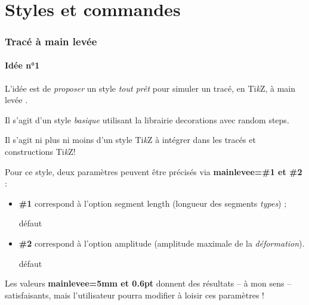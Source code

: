 \documentclass[french,a4paper,11pt]{article}
\providecommand\tikzlogo{Ti\textit{k}Z}
\let\TikZ\tikzlogo
\newcommand\Cle[1]{{\bfseries\sffamily\textlangle #1\textrangle}}
\begin{document}
\vfill~

\pagebreak

\part{Styles et commandes}

\section{Tracé à main levée}

\subsection{Idée n°1}

\begin{tipblock}
L'idée est de \textit{proposer} un style \textit{tout prêt} pour simuler un tracé, en \TikZ, à \og main levée \fg.

Il s'agit d'un style \textit{basique} utilisant la librairie \textsf{decorations} avec \textsf{random steps}.
\end{tipblock}

\begin{DemoCode}
\end{DemoCode}

\begin{cautionblock}
Il s'agit ni plus ni moins d'un style \TikZ{} à intégrer dans les tracés et constructions \TikZ !

\smallskip

Pour ce style, deux paramètres peuvent être précisés via \Cle{mainlevee=\#1 et \#2} :

\begin{itemize}
	\item \Cle{\#1} correspond à l'option \textsf{segment length} (longueur des segments \textit{types}) ;
	
	\hfill{}défaut \Cle{5mm}
	\item \Cle{\#2} correspond à l'option \textsf{amplitude} (amplitude maximale de la \textit{déformation}).
	
	\hfill{}défaut \Cle{0.6pt}
\end{itemize}

Les valeurs \Cle{mainlevee=5mm et 0.6pt} donnent des résultats -- à mon sens -- satisfaisants, mais l'utilisateur pourra modifier à loisir ces paramètres !
\end{cautionblock}
\end{document}
